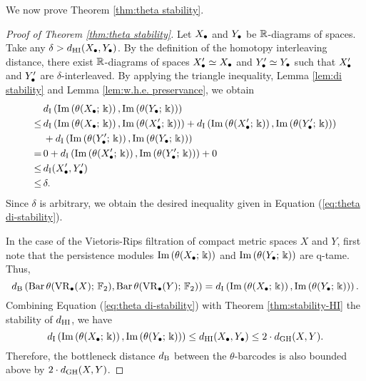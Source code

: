 We now prove Theorem \ref{thm:theta stability}.

\begin{proof}[Proof of Theorem \ref{thm:theta stability}]
    Let $\Xfunc$ and $\Yfunc$ be $\R$-diagrams of spaces. Take any $\delta>\dhi(\Xfunc,\Yfunc)$. By the definition of the homotopy interleaving distance, there exist $\R$-diagrams of spaces $\Xfunc'\simeq \Xfunc$ and $\Yfunc'\simeq \Yfunc$ such that $\Xfunc'$ and $\Yfunc'$ are $\delta$-interleaved. By applying the triangle inequality, Lemma \ref{lem:di stability} and Lemma \ref{lem:w.h.e. preservance}, we obtain
    \begin{align*}
            &\di\left(\thetamodule{\Xfunc}, \thetamodule{\Yfunc}\right)\\
        \leq\, &  \di\left(\thetamodule{\Xfunc}, \thetamodule{\Xfunc'}\right)+
        \di\left(\thetamodule{\Xfunc'}, \thetamodule{\Yfunc'}\right)\\
        &+\di\left(\thetamodule{\Yfunc'}, \thetamodule{\Yfunc}\right)\\
        =\, & 0+\di\left(\thetamodule{\Xfunc'}, \thetamodule{\Yfunc'}\right)+0\\
        \leq \,& \di(\Xfunc',\Yfunc') \\
        \leq \,& \delta.
    \end{align*}
    Since $\delta$ is arbitrary, we obtain the desired inequality given in Equation (\ref{eq:theta di-stability}).

    In the case of the Vietoris-Rips filtration of compact metric spaces $X$ and $Y$, first note that the persistence modules $\thetamodule{\Xfunc}$ and $\thetamodule{\Yfunc}$ are q-tame. Thus, 
    \[\db\left(\thetabarc{X}, \thetabarc{Y}\right)=\di\left(\thetamodule{\Xfunc}, \thetamodule{\Yfunc}\right).\]
    Combining Equation (\ref{eq:theta di-stability}) with Theorem \ref{thm:stability-HI} the stability of $\dhi$, we have
    \[\di\left(\thetamodule{\Xfunc}, \thetamodule{\Yfunc}\right)\leq \dhi(\Xfunc,\Yfunc)\leq 2\cdot \dgh(X,Y).\]
    Therefore, the bottleneck distance $\db$ between the $\theta$-barcodes is also bounded above by $2\cdot \dgh(X,Y)$.
\end{proof}